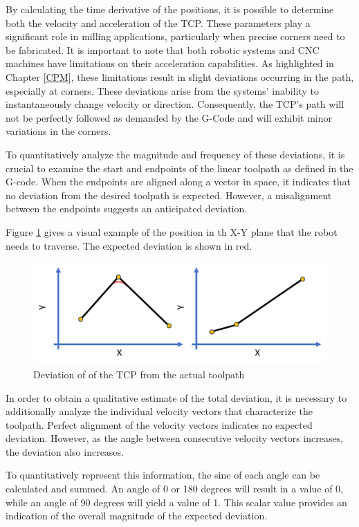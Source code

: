 By calculating the time derivative of the positions, it is possible to determine both the velocity and acceleration of the TCP. These parameters play a significant role in milling applications, particularly when precise corners need to be fabricated. It is important to note that both robotic systems and CNC machines have limitations on their acceleration capabilities. As highlighted in Chapter \ref{CPM}, these limitations result in slight deviations occurring in the path, especially at corners. These deviations arise from the systems' inability to instantaneously change velocity or direction. Consequently, the TCP's path will not be perfectly followed as demanded by the G-Code and will exhibit minor variations in the corners.

To quantitatively analyze the magnitude and frequency of these deviations, it is crucial to examine the start and endpoints of the linear toolpath as defined in the G-code. When the endpoints are aligned along a vector in space, it indicates that no deviation from the desired toolpath is expected. However, a misalignment between the endpoints suggests an anticipated deviation.

Figure \ref{devi} gives a visual example of the position in th X-Y plane that the robot needs to traverse. The expected deviation is shown in red.

\begin{figure}[H]
	\centerline{\includegraphics[width=.651\textwidth]{figures/uber.png}}
	\caption{Deviation of of the TCP from the actual toolpath}
	\label{devi}
\end{figure}

In order to obtain a qualitative estimate of the total deviation, it is necessary to additionally analyze the individual velocity vectors that characterize the toolpath. Perfect alignment of the velocity vectors indicates no expected deviation. However, as the angle between consecutive velocity vectors increases, the deviation also increases.

To quantitatively represent this information, the sine of each angle can be calculated and summed. An angle of 0 or 180 degrees will result in a value of 0, while an angle of 90 degrees will yield a value of 1. This scalar value provides an indication of the overall magnitude of the expected deviation.

